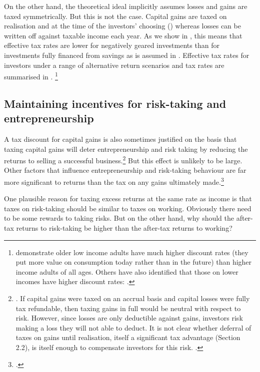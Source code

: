 On the other hand, the theoretical ideal implicitly assumes losses and gains are taxed symmetrically. But this is not the case. Capital gains are taxed on realisation and at the time of the investors’ choosing () whereas losses can be written off against taxable income each year. As we show in , this means that effective tax rates are lower for negatively geared investments than for investments fully financed from savings as is assumed in . Effective tax rates for investors under a range of alternative return scenarios and tax rates are summarised in .%
\footnote{\textcite{GreenMyersonLichtmanEtAl1996} demonstrate older low income adults have much higher discount rates (\ie they put more value on consumption today rather than in the future) than higher income adults of all ages. Others have also identified that those on lower incomes have higher discount rates:  \textcites{ReimersMaylorStewartEtAl2009}{HarrisonLauWilliams2002}.}

\subsection{Maintaining incentives for risk-taking and entrepreneurship}\label{subsubsec:maintain-incentives-for-risk-taking}
A tax discount for capital gains is also sometimes justified on the basis that taxing capital gains will deter entrepreneurship and risk taking by reducing the returns to selling a successful business.\footnote{\textcite[][8--11]{ClemensLammamLo2014}. If capital gains were taxed on an accrual basis and capital losses were fully tax refundable, then taxing gains in full would be neutral with respect to risk. However, since losses are only deductible against gains, investors risk making a loss they will not able to deduct. It is not clear whether deferral of taxes on gains until realisation, itself a significant tax advantage (Section 2.2), is itself enough to compensate investors for this risk. \textcites[8]{Burman2009}[130]{ProductivityCommission2004FirstHomeOwnership}.} 
But this effect is unlikely to be large. Other factors that influence entrepreneurship and risk-taking behaviour are far more significant to returns than the tax on any gains ultimately made.\footcite[][75]{Burman1999} 

One plausible reason for taxing excess returns at the same rate as income is that taxes on risk-taking should be similar to taxes on working. Obviously there need to be some rewards to taking risks. But on the other hand, why should the after-tax returns to risk-taking be higher than the after-tax returns to working? 

